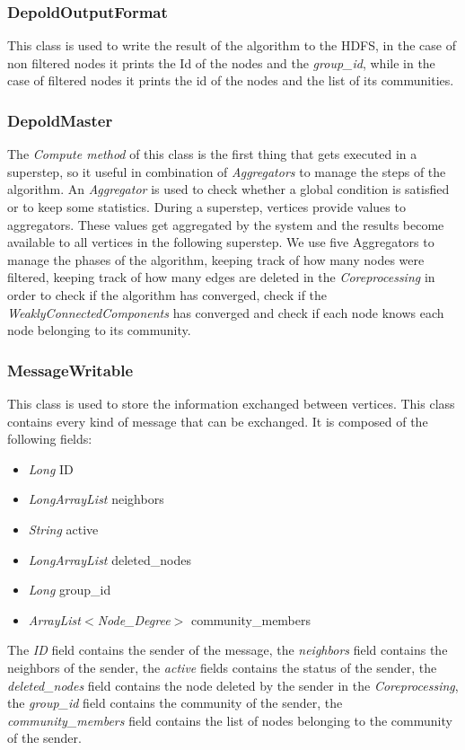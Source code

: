 \documentclass[12pt]{article}
\begin{document}
\subsubsection{DepoldOutputFormat}
This class is used to write the result of the algorithm to the HDFS, in the case of non filtered nodes it prints the Id of the nodes and the \emph{group\_id}, while in the case of filtered nodes it prints the id of the nodes and the list of its communities.
\subsubsection{DepoldMaster}
The \emph{Compute method} of this class is the first thing that gets executed in a superstep, so it useful in combination of \emph{Aggregators} to manage the steps of the algorithm. An \emph{Aggregator} is used to check whether a global condition is satisfied or to keep some statistics. During a superstep, vertices provide values to aggregators. These values get aggregated by the system and the results become available to all vertices in the following superstep. We use five Aggregators to manage the phases of the algorithm, keeping track of how many nodes were filtered, keeping track of how many edges are deleted in the \emph{Coreprocessing} in order to check if the algorithm has converged, check if the \emph{WeaklyConnectedComponents} has converged and check if each node knows each node belonging to its community.
\subsubsection{MessageWritable}
This class is used to store the information exchanged between vertices. This class contains every kind of message that can be exchanged.
It is composed of the following fields:
\begin{itemize}
    \item \emph{Long} ID
    \item \emph{LongArrayList} neighbors
    \item \emph{String} active
    \item \emph{LongArrayList} deleted\_nodes
    \item \emph{Long} group\_id
    \item \emph{ArrayList$<$Node\_Degree$>$} community\_members
\end{itemize}
    The \emph{ID} field contains the sender of the message, the \emph{neighbors} field contains the neighbors of the sender, the \emph{active} fields contains the status of the sender, the \emph{deleted\_nodes} field contains the node deleted by the sender in the \emph{Coreprocessing},
    the \emph{group\_id} field contains the community of the sender, the \emph{community\_members} field contains the list of nodes belonging to the community of the sender.
\end{document}
